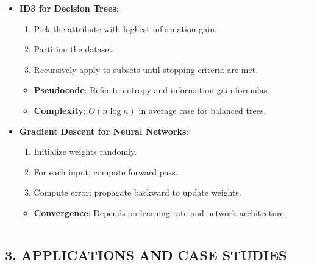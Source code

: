 \documentclass[
  12pt,
]{report}
\providecommand{\tightlist}{%
  \setlength{\itemsep}{0pt}\setlength{\parskip}{0pt}}
\begin{document}
\begin{itemize}
\tightlist
\item
  \textbf{ID3 for Decision Trees}:

  \begin{enumerate}
  \def\labelenumi{\arabic{enumi}.}
  \tightlist
  \item
    Pick the attribute with highest information gain.
  \item
    Partition the dataset.
  \item
    Recursively apply to subsets until stopping criteria are met.
  \end{enumerate}

  \begin{itemize}
  \tightlist
  \item
    \textbf{Pseudocode}: Refer to entropy and information gain formulas.
  \item
    \textbf{Complexity}: \(O(n \log n)\) in average case for balanced trees.
  \end{itemize}
\item
  \textbf{Gradient Descent for Neural Networks}:

  \begin{enumerate}
  \def\labelenumi{\arabic{enumi}.}
  \tightlist
  \item
    Initialize weights randomly.
  \item
    For each input, compute forward pass.
  \item
    Compute error; propagate backward to update weights.
  \end{enumerate}

  \begin{itemize}
  \tightlist
  \item
    \textbf{Convergence}: Depends on learning rate and network architecture.
  \end{itemize}
\end{itemize}

\begin{center}\rule{0.5\linewidth}{0.5pt}\end{center}

\subsection{3. APPLICATIONS AND CASE STUDIES}\label{applications-and-case-studies}
\end{document}
